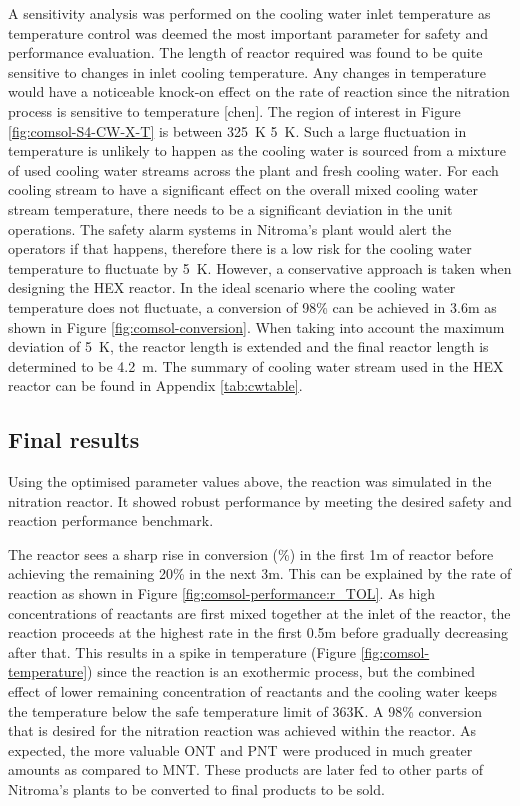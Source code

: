 A sensitivity analysis was performed on the cooling water inlet temperature as temperature control was deemed the most important parameter for safety and performance evaluation. The length of reactor required was found to be quite sensitive to changes in inlet cooling temperature. Any changes in temperature would have a noticeable knock-on effect on the rate of reaction since the nitration process is sensitive to temperature [chen]. The region of interest in Figure \ref{fig:comsol-S4-CW-X-T} is between \SI{325}{\K} \pm \SI{5}{\K}. Such a large fluctuation in temperature is unlikely to happen as the cooling water is sourced from a mixture of used cooling water streams across the plant and fresh cooling water. For each cooling stream to have a significant effect on the overall mixed cooling water stream temperature, there needs to be a significant deviation in the unit operations. The safety alarm systems in Nitroma's plant would alert the operators if that happens, therefore there is a low risk for the cooling water temperature to fluctuate by \pm \SI{5}{\K}. However, a conservative approach is taken when designing the HEX reactor. In the ideal scenario where the cooling water temperature does not fluctuate, a conversion of 98\% can be achieved in 3.6m as shown in Figure \ref{fig:comsol-conversion}. When taking into account the maximum deviation of \pm \SI{5}{\K}, the reactor length is extended and the final reactor length is determined to be \SI{4.2}{\metre}. The summary of cooling water stream used in the HEX reactor can be found in Appendix \ref{tab:cwtable}.

\subsection{Final results}
\label{finalresults}
Using the optimised parameter values above, the reaction was simulated in the nitration reactor. It showed robust performance by meeting the desired safety and reaction performance benchmark.

The reactor sees a sharp rise in conversion (\%) in the first 1m of reactor before achieving the remaining 20\% in the next \approx 3m. This can be explained by the rate of reaction as shown in Figure \ref{fig:comsol-performance:r_TOL}. As high concentrations of reactants are first mixed together at the inlet of the reactor, the reaction proceeds at the highest rate in the first 0.5m before gradually decreasing after that. This results in a spike in temperature (Figure \ref{fig:comsol-temperature}) since the reaction is an exothermic process, but the combined effect of lower remaining concentration of reactants and the cooling water keeps the temperature below the safe temperature limit of 363K. A 98\% conversion that is desired for the nitration reaction was achieved within the reactor. As expected, the more valuable ONT and PNT were produced in much greater amounts as compared to MNT. These products are later fed to other parts of Nitroma's plants to be converted to final products to be sold.

